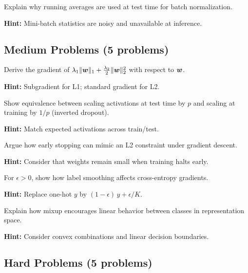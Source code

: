 \begin{problem}
Explain why running averages are used at test time for batch normalization.

\textbf{Hint:} Mini-batch statistics are noisy and unavailable at inference.
\end{problem}

\subsection{Medium Problems (5 problems)}

\begin{problem}
Derive the gradient of $\lambda_1 \|\boldsymbol{w}\|_1 + \frac{\lambda_2}{2}\|\boldsymbol{w}\|_2^2$ with respect to $\boldsymbol{w}$.

\textbf{Hint:} Subgradient for L1; standard gradient for L2.
\end{problem}

\begin{problem}
Show equivalence between scaling activations at test time by $p$ and scaling at training by $1/p$ (inverted dropout).

\textbf{Hint:} Match expected activations across train/test.
\end{problem}

\begin{problem}
Argue how early stopping can mimic an L2 constraint under gradient descent.

\textbf{Hint:} Consider that weights remain small when training halts early.
\end{problem}

\begin{problem}
For $\epsilon>0$, show how label smoothing affects cross-entropy gradients.

\textbf{Hint:} Replace one-hot $y$ by $(1-\epsilon)\,y + \epsilon/K$.
\end{problem}

\begin{problem}
Explain how mixup encourages linear behavior between classes in representation space.

\textbf{Hint:} Consider convex combinations and linear decision boundaries.
\end{problem}

\subsection{Hard Problems (5 problems)}

